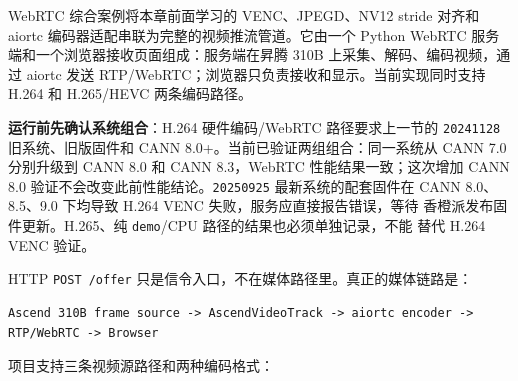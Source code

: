 WebRTC 综合案例将本章前面学习的 VENC、JPEGD、NV12 stride 对齐和 aiortc
编码器适配串联为完整的视频推流管道。它由一个 Python WebRTC
服务端和一个浏览器接收页面组成：服务端在昇腾 310B
上采集、解码、编码视频，通过 aiortc 发送
RTP/WebRTC；浏览器只负责接收和显示。当前实现同时支持 H.264 和 H.265/HEVC
两条编码路径。

\textbf{运行前先确认系统组合}：H.264 硬件编码/WebRTC 路径要求上一节的
\passthrough{\lstinline!20241128!} 旧系统、旧版固件和 CANN
8.0+。当前已验证两组组合：同一系统从 CANN 7.0 分别升级到 CANN 8.0 和
CANN 8.3，WebRTC 性能结果一致；这次增加 CANN 8.0
验证不会改变此前性能结论。\passthrough{\lstinline!20250925!}
最新系统的配套固件在 CANN 8.0、8.5、9.0 下均导致 H.264 VENC
失败，服务应直接报告错误，等待 香橙派发布固件更新。H.265、纯
\passthrough{\lstinline!demo!}/CPU 路径的结果也必须单独记录，不能 替代
H.264 VENC 验证。

HTTP \passthrough{\lstinline!POST /offer!}
只是信令入口，不在媒体路径里。真正的媒体链路是：

\begin{lstlisting}
Ascend 310B frame source -> AscendVideoTrack -> aiortc encoder -> RTP/WebRTC -> Browser
\end{lstlisting}

项目支持三条视频源路径和两种编码格式：

